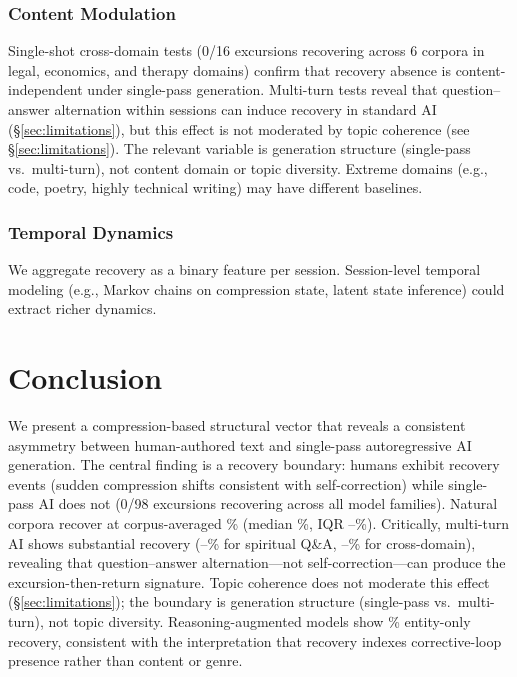 \documentclass[11pt]{article}
\begin{document}
\subsubsection{Content Modulation}

Single-shot cross-domain tests (0/16 excursions recovering across 6 corpora in legal, economics, and therapy domains) confirm that recovery absence is content-independent under single-pass generation. Multi-turn tests reveal that question--answer alternation within sessions can induce recovery in standard AI (\S\ref{sec:limitations}), but this effect is not moderated by topic coherence (see \S\ref{sec:limitations}). The relevant variable is generation structure (single-pass vs.\ multi-turn), not content domain or topic diversity. Extreme domains (e.g., code, poetry, highly technical writing) may have different baselines.

\subsubsection{Temporal Dynamics}

We aggregate recovery as a binary feature per session. Session-level temporal modeling (e.g., Markov chains on compression state, latent state inference) could extract richer dynamics.


\section{Conclusion}

We present a compression-based structural vector that reveals a consistent asymmetry between human-authored text and single-pass autoregressive AI generation. The central finding is a recovery boundary: humans exhibit recovery events (sudden compression shifts consistent with self-correction) while single-pass AI does not (0/98 excursions recovering across all model families). Natural corpora recover at corpus-averaged \recNatCorpusAvg\% (median \recNatMedian\%, IQR \recNatIQRlo--\recNatIQRhi\%). Critically, multi-turn AI shows substantial recovery (\recClaudeMT--\recGPTMT\% for spiritual Q\&A, \recMTXdomMin--\recMTXdomMax\% for cross-domain), revealing that question--answer alternation---not self-correction---can produce the excursion-then-return signature. Topic coherence does not moderate this effect (\S\ref{sec:limitations}); the boundary is generation structure (single-pass vs.\ multi-turn), not topic diversity. Reasoning-augmented models show \recReasoningEntity\% entity-only recovery, consistent with the interpretation that recovery indexes corrective-loop presence rather than content or genre.
\end{document}
